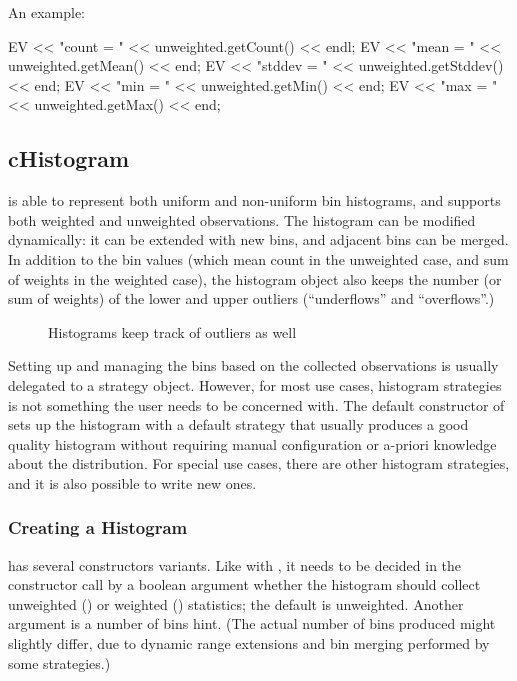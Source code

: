 An example:

\begin{cpp}
EV << "count = " << unweighted.getCount() << endl;
EV << "mean = " << unweighted.getMean() << end;
EV << "stddev = " << unweighted.getStddev() << end;
EV << "min = " << unweighted.getMin() << end;
EV << "max = " << unweighted.getMax() << end;
\end{cpp}


\subsection{cHistogram}
\label{sec:sim-lib:histograms}

 is able to represent both uniform and non-uniform
bin histograms, and supports both weighted and unweighted observations.
The histogram can be modified dynamically: it can be extended with new bins,
and adjacent bins can be merged. In addition to the bin values (which mean
count in the unweighted case, and sum of weights in the weighted case),
the histogram object also keeps the number (or sum of weights) of the
lower and upper outliers (``underflows'' and ``overflows''.)

\begin{figure}[htbp]
  \begin{center}
    
    \caption{Histograms keep track of outliers as well}
  \end{center}
\end{figure}

Setting up and managing the bins based on the collected observations
is usually delegated to a strategy object. However, for most
use cases, histogram strategies is not something the user needs
to be concerned with. The default constructor of 
sets up the histogram with a default strategy that usually produces
a good quality histogram without requiring manual configuration or a-priori
knowledge about the distribution. For special use cases, there are
other histogram strategies, and it is also possible to write new ones.

\subsubsection{Creating a Histogram}
\label{sec:sim-lib:creating-a-histogram}

 has several constructors variants. Like with
, it needs to be decided in the constructor call
by a boolean argument whether the histogram should collect
unweighted () or weighted () statistics;
the default is unweighted. Another argument is a number of bins
hint. (The actual number of bins produced might slightly differ,
due to dynamic range extensions and bin merging performed by
some strategies.)

